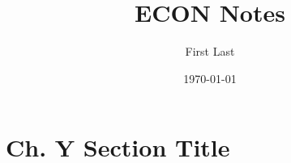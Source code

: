 \documentclass{scrartcl}
\title{ECON Notes}
\author{First Last}
\date{\today}
\begin{document}
\maketitle

\section{Ch. Y Section Title}
\end{document}
